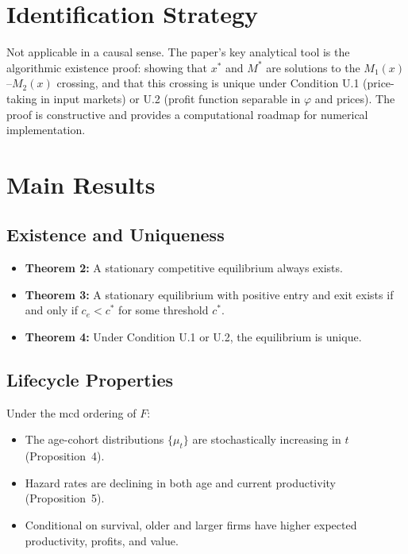 \section{Identification Strategy}

Not applicable in a causal sense. The paper's key analytical tool is the
algorithmic existence proof: showing that $x^*$ and $M^*$ are solutions to
the $M_1(x)$--$M_2(x)$ crossing, and that this crossing is unique under
Condition U.1 (price-taking in input markets) or U.2 (profit function
separable in $\varphi$ and prices). The proof is constructive and provides a
computational roadmap for numerical implementation.

\section{Main Results}

\subsection*{Existence and Uniqueness}

\begin{itemize}
  \item \textbf{Theorem 2:} A stationary competitive equilibrium always exists.
  \item \textbf{Theorem 3:} A stationary equilibrium with positive entry and
    exit exists if and only if $c_e < c^*$ for some threshold $c^*$.
  \item \textbf{Theorem 4:} Under Condition U.1 or U.2, the equilibrium is
    unique.
\end{itemize}

\subsection*{Lifecycle Properties}

Under the mcd ordering of $F$:
\begin{itemize}
  \item The age-cohort distributions $\{\mu_t\}$ are stochastically increasing
    in $t$ (Proposition~4).
  \item Hazard rates are declining in both age and current productivity
    (Proposition~5).
  \item Conditional on survival, older and larger firms have higher expected
    productivity, profits, and value.
\end{itemize}

